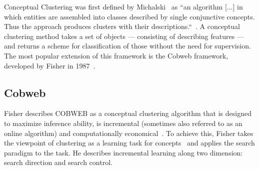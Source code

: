\noindent Conceptual Clustering was first defined by Michalski~\cite{michalski1980knowledge} as ``an algorithm [...] in which entities are assembled into classes described by single conjunctive concepts. Thus the approach produces clusters with their descriptions.``~\cite{michalski1980knowledge}. A conceptual clustering method takes a set of objects --- consisting of describing features --- and returns a scheme for classification of those without the need for supervision. The most popular extension of this framework is the Cobweb framework, developed by Fisher in 1987~\cite{Fisher1987}.

\subsection{Cobweb}\label{\positionnumber}
Fisher describes COBWEB as a conceptual clustering algorithm that is designed to maximize inference ability, is incremental (sometimes also referred to as an online algorithm) and computationally economical~\cite{Fisher1987}. To achieve this, Fisher takes the viewpoint of clustering as a learning task for concepts~\cite{mitchell1982generalization} and applies the search paradigm to the task. He describes incremental learning along two dimension: search direction and search control. \\

